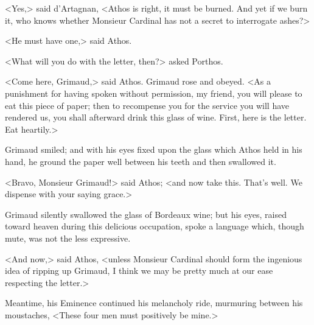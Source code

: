 <Yes,> said d'Artagnan, <Athos is right, it must be burned. And yet if we burn it, who knows whether Monsieur Cardinal has not a secret to interrogate ashes?> 

<He must have one,> said Athos. 

<What will you do with the letter, then?> asked Porthos. 

<Come here, Grimaud,> said Athos. Grimaud rose and obeyed. <As a punishment for having spoken without permission, my friend, you will please to eat this piece of paper; then to recompense you for the service you will have rendered us, you shall afterward drink this glass of wine. First, here is the letter. Eat heartily.> 

Grimaud smiled; and with his eyes fixed upon the glass which Athos held in his hand, he ground the paper well between his teeth and then swallowed it. 

<Bravo, Monsieur Grimaud!> said Athos; <and now take this. That's well. We dispense with your saying grace.> 

Grimaud silently swallowed the glass of Bordeaux wine; but his eyes, raised toward heaven during this delicious occupation, spoke a language which, though mute, was not the less expressive. 

<And now,> said Athos, <unless Monsieur Cardinal should form the ingenious idea of ripping up Grimaud, I think we may be pretty much at our ease respecting the letter.> 

Meantime, his Eminence continued his melancholy ride, murmuring between his moustaches, <These four men must positively be mine.> 